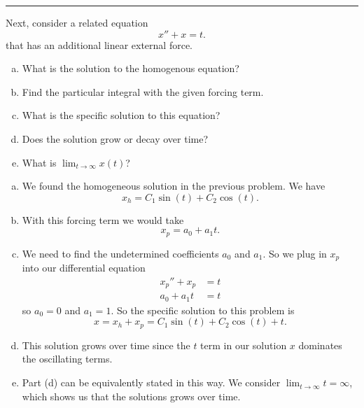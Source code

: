 \documentclass[12pt]{article} %
\begin{document}
\hrule
\begin{problem}
Next, consider a related equation
\[
x''+x=t.
\]
that has an additional linear external force.
\begin{enumerate}[(a)]
    \item What is the solution to the homogenous equation?
    \item Find the particular integral with the given forcing term.
    \item What is the specific solution to this equation?
    \item Does the solution grow or decay over time?
    \item What is $\lim_{t\to \infty}x(t)$?
\end{enumerate}
\end{problem}
\begin{solution}
\begin{enumerate}[(a)]
    \item We found the homogeneous solution in the previous problem. We have
    \[
    x_h = C_1\sin(t)+C_2\cos(t).
    \]
    \item With this forcing term we would take 
    \[
    x_p = a_0 + a_1t.
    \]
    \item We need to find the undetermined coefficients $a_0$ and $a_1$.  So we plug in $x_p$ into our differential equation
    \begin{align*}
        x_p''+x_p&=t\\
        a_0+a_1t&=t
    \end{align*}
    so $a_0=0$ and $a_1=1$. So the specific solution to this problem is
    \[
    \boxed{x=x_h+x_p=C_1\sin(t)+C_2\cos(t)+t.}
    \]
    \item This solution grows over time since the $t$ term in our solution $x$ dominates the oscillating terms.
    \item Part (d) can be equivalently stated in this way.  We consider $\lim_{t\to \infty} t = \infty$, which shows us that the solutions grows over time.
\end{enumerate}
\end{solution}
\end{document}
